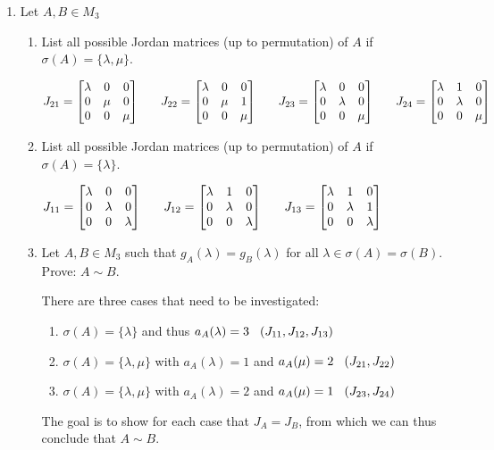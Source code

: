 \documentclass[letterpaper,12pt,fleqn]{article}
\renewcommand{\l}{\lambda}
\newcommand{\m}{\mu}
\renewcommand{\o}{\sigma}
\begin{document}
\begin{enumerate}
  \newcommand{\JZ}{\begin{bmatrix} 0 & 0 & 0 \\ 0 & 0 & 0 \\ 0 & 0 & 0 \end{bmatrix}}
    
\item Let $A,B\in M_3$
  \begin{enumerate}
  \item List all possible Jordan matrices (up to permutation) of $A$ if
    $\o(A)=\{\l,\m\}$.

    $J_{21}=\JD\hspace{4ex}J_{22}=\JE\hspace{4ex}J_{23}=\JF\hspace{4ex}J_{24}=\JG$

  \item List all possible Jordan matrices (up to permutation) of $A$ if $\o(A)=\{\l\}$.

    $J_{11}=\JA\hspace{4ex}J_{12}=\JB\hspace{4ex}J_{13}=\JC$

  \item Let $A,B\in M_3$ such that $g_A(\l)=g_B(\l)$ for all $\l\in\o(A)=\o(B)$.
    Prove: $A\sim B$.

    There are three cases that need to be investigated:
    \begin{enumerate}
    \item $\o(A)=\{\l\}$ and thus $a_A(\l)=3\hspace{2ex}(J_{11},J_{12},J_{13})$
    \item $\o(A)=\{\l,\m\}$ with $a_A(\l)=1$ and $a_A(\m)=2\hspace{2ex}(J_{21},J_{22})$
    \item $\o(A)=\{\l,\m\}$ with $a_A(\l)=2$ and $a_A(\m)=1\hspace{2ex}(J_{23},J_{24})$
    \end{enumerate}

    The goal is to show for each case that $J_A=J_B$, from which we can thus conclude
    that $A\sim B$.


\end{enumerate}
\end{enumerate}
\end{document}

